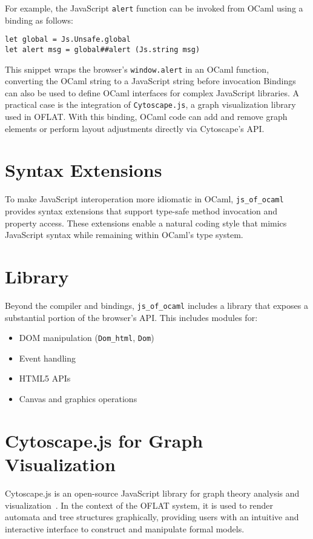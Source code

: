 For example, the JavaScript \texttt{alert} function can be invoked from OCaml using a binding as follows:

\begin{verbatim}
let global = Js.Unsafe.global
let alert msg = global##alert (Js.string msg)
\end{verbatim}

This snippet wraps the browser's \texttt{window.alert} in an OCaml function, converting the OCaml string to a JavaScript string before invocation
Bindings can also be used to define OCaml interfaces for complex JavaScript libraries. 
A practical case is the integration of \texttt{Cytoscape.js}, a graph visualization library used in OFLAT.
With this binding, OCaml code can add and remove graph elements or perform layout adjustments directly via Cytoscape's API.

\section*{Syntax Extensions}

To make JavaScript interoperation more idiomatic in OCaml, 
\texttt{js\_of\_ocaml} provides syntax extensions that support type-safe method invocation and property access. 
These extensions enable a natural coding style that mimics JavaScript syntax while remaining within OCaml's type system.

\section*{Library}

Beyond the compiler and bindings, \texttt{js\_of\_ocaml} includes a library that exposes a substantial portion of the browser's API. 
This includes modules for:
\begin{itemize}
  \item DOM manipulation (\texttt{Dom\_html}, \texttt{Dom})
  \item Event handling
  \item HTML5 APIs
  \item Canvas and graphics operations
\end{itemize}


\section{Cytoscape.js for Graph Visualization}

Cytoscape.js is an open-source JavaScript library for graph theory analysis and visualization~\cite{cytoscape}. 
In the context of the OFLAT system, it is used to render automata and tree structures graphically, 
providing users with an intuitive and interactive interface to construct and manipulate formal models. 

